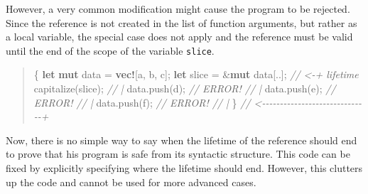 \documentclass[
  11pt,
  twoside,symmetric]{report}
\newenvironment{Shaded}{}{}
\newcommand{\CharTok}[1]{#1}
\newcommand{\CommentTok}[1]{\textit{#1}}
\newcommand{\KeywordTok}[1]{\textbf{#1}}
\newcommand{\NormalTok}[1]{#1}
\newcommand{\OperatorTok}[1]{#1}
\newcommand{\PreprocessorTok}[1]{\textbf{#1}}
\begin{document}
However, a very common modification might cause the program to be
rejected. Since the reference is not created in the list of function
arguments, but rather as a local variable, the special case does not
apply and the reference must be valid until the end of the scope of the
variable \texttt{slice}.

\begin{quote}
\begin{Shaded}
\begin{Highlighting}[]
\OperatorTok{\{}
    \KeywordTok{let} \KeywordTok{mut}\NormalTok{ data }\OperatorTok{=} \PreprocessorTok{vec!}\NormalTok{[}\CharTok{\textquotesingle{}a\textquotesingle{}}\OperatorTok{,} \CharTok{\textquotesingle{}b\textquotesingle{}}\OperatorTok{,} \CharTok{\textquotesingle{}c\textquotesingle{}}\NormalTok{]}\OperatorTok{;}
    \KeywordTok{let}\NormalTok{ slice }\OperatorTok{=} \OperatorTok{\&}\KeywordTok{mut}\NormalTok{ data[}\OperatorTok{..}\NormalTok{]}\OperatorTok{;} \CommentTok{// \textless{}{-}+ \textquotesingle{}lifetime}
\NormalTok{    capitalize(slice)}\OperatorTok{;}         \CommentTok{//   |}
\NormalTok{    data}\OperatorTok{.}\NormalTok{push(}\CharTok{\textquotesingle{}d\textquotesingle{}}\NormalTok{)}\OperatorTok{;} \CommentTok{// ERROR!  //   |}
\NormalTok{    data}\OperatorTok{.}\NormalTok{push(}\CharTok{\textquotesingle{}e\textquotesingle{}}\NormalTok{)}\OperatorTok{;} \CommentTok{// ERROR!  //   |}
\NormalTok{    data}\OperatorTok{.}\NormalTok{push(}\CharTok{\textquotesingle{}f\textquotesingle{}}\NormalTok{)}\OperatorTok{;} \CommentTok{// ERROR!  //   |}
\OperatorTok{\}} \CommentTok{// \textless{}{-}{-}{-}{-}{-}{-}{-}{-}{-}{-}{-}{-}{-}{-}{-}{-}{-}{-}{-}{-}{-}{-}{-}{-}{-}{-}{-}{-}{-}{-}+}
\end{Highlighting}
\end{Shaded}
\end{quote}

Now, there is no simple way to say when the lifetime of the reference
should end to prove that his program is safe from its syntactic
structure. This code can be fixed by explicitly specifying where the
lifetime should end. However, this clutters up the code and cannot be
used for more advanced cases.
\end{document}
